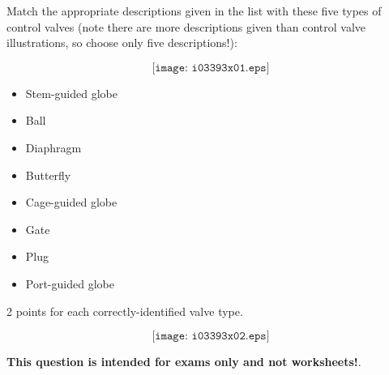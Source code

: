 

Match the appropriate descriptions given in the list with these five types of control valves (note there are more descriptions given than control valve illustrations, so choose only five descriptions!):

$$\texttt{[image: i03393x01.eps]}$$

\begin{itemize}
\item{} Stem-guided globe
\item{} Ball
\item{} Diaphragm
\item{} Butterfly
\item{} Cage-guided globe
\item{} Gate
\item{} Plug
\item{} Port-guided globe
\end{itemize}







2 points for each correctly-identified valve type.

$$\texttt{[image: i03393x02.eps]}$$







{\bf This question is intended for exams only and not worksheets!}.



